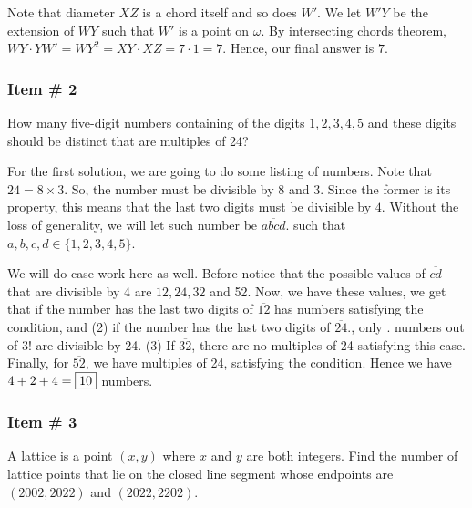 \documentclass[11pt,paper=letter]{scrartcl}
\begin{document}
Note that diameter $XZ$ is a chord itself and so does $W'$. We let $W'Y$ be the extension of $WY$ such that $W'$ is a point on $\omega$. By intersecting chords theorem, $WY \cdot YW' = WY^2 = XY \cdot XZ = 7 \cdot 1 = 7.$ Hence, our final answer is $7.$

\subsubsection{Item \# 2}

\begin{probboxed}
 How many five-digit numbers containing of the digits $1,2,3,4,5$ and these digits should be distinct that are multiples of 24?
    
\end{probboxed}


\sol 

For the first solution, we are going to do some listing of numbers. Note that $24 = 8 \times 3$. So, the number must be divisible by $8$ and $3.$ Since the former is its property, this means that the last two digits must be divisible by $4.$ Without the loss of generality, we will let such number be $\overline{abcd}.$ such that $a,b,c,d \in \{1,2,3,4,5\}$. 


We will do case work here as well. Before notice that the possible values of $\overline{cd}$ that are divisible by 4 are $12, 24, 32$ and 52. Now, we have these values, we get that if the number has the last two digits of $\overline{12}$ has  numbers satisfying the condition, and (2) if the number has the last two digits of $\overline{24}.$, only . numbers out of 3! are divisible by 24. (3) If $\overline{32}$, there are no multiples of 24 satisfying this case. Finally, for $\overline{52}$, we have  multiples of 24, satisfying the condition. Hence we have $4+2+4 = \fbox{10}$ numbers.

\subsubsection{Item \# 3}

\begin{probboxed}
A lattice is a point $(x,y)$ where $x$ and $y$ are both integers. Find the number of lattice points that lie on the closed line segment whose endpoints are $(2002, 2022)$ and $(2022, 2202).$
    
\end{probboxed}
\end{document}
